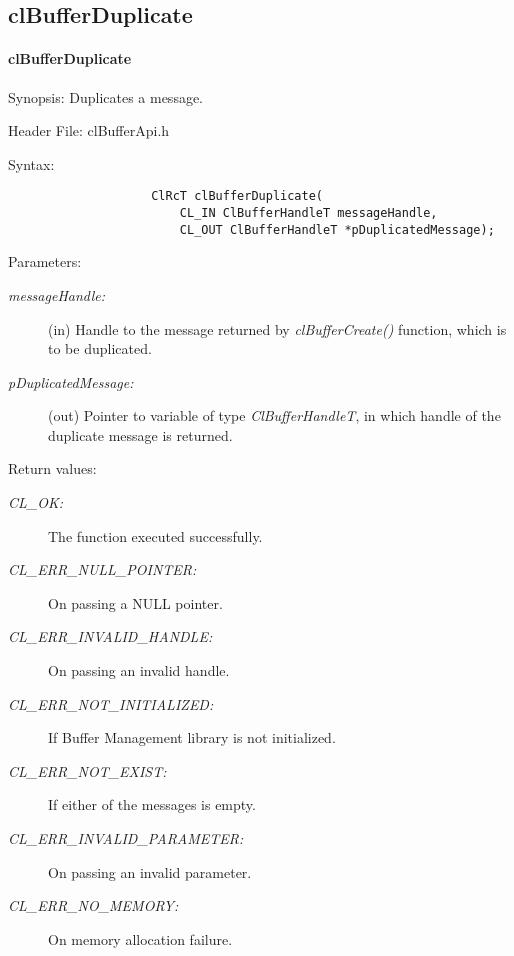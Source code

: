 \subsection{clBufferDuplicate}
\hypertarget{pagebuf127}{}\paragraph{cl\-Buffer\-Duplicate}\label{pagebuf127}
\begin{Desc}
\item[Synopsis:]Duplicates a message.\end{Desc}
\begin{Desc}
\item[Header File:]clBufferApi.h\end{Desc}
\begin{Desc}
\item[Syntax:]

\footnotesize\begin{verbatim}   
					ClRcT clBufferDuplicate(
						CL_IN ClBufferHandleT messageHandle,
						CL_OUT ClBufferHandleT *pDuplicatedMessage);

\end{verbatim}
\normalsize
\end{Desc}
\begin{Desc}
\item[Parameters:]
\begin{description}
\item[{\em message\-Handle:}](in) Handle to the message returned by \textit{clBufferCreate()} function, which is to be duplicated. 
\item[{\em p\-Duplicated\-Message:}](out) Pointer to variable of type {\em Cl\-Buffer\-Handle\-T\/}, in which handle of the duplicate message is returned.\end{description}
\end{Desc}
\begin{Desc}
\item[Return values:]
\begin{description}
\item[{\em CL\_\-OK:}]The function executed successfully. 
\item[{\em CL\_\-ERR\_\-NULL\_\-POINTER:}]On passing a NULL pointer. 
\item[{\em CL\_\-ERR\_\-INVALID\_\-HANDLE:}]On passing an invalid handle. 
\item[{\em CL\_\-ERR\_\-NOT\_\-INITIALIZED:}]If Buffer Management library is not initialized. 
\item[{\em CL\_\-ERR\_\-NOT\_\-EXIST:}]If either of the messages is empty. 
\item[{\em CL\_\-ERR\_\-INVALID\_\-PARAMETER:}]On passing an invalid parameter. 
\item[{\em CL\_\-ERR\_\-NO\_\-MEMORY:}]On memory allocation failure.\end{description}
\end{Desc}
